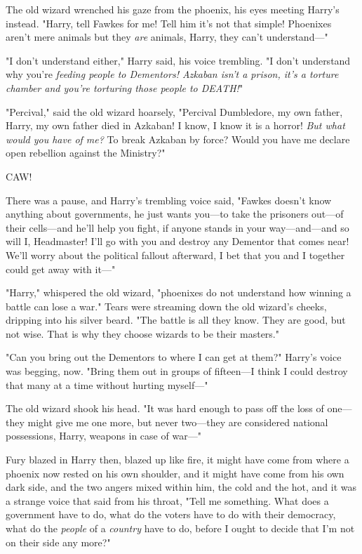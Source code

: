The old wizard wrenched his gaze from the phoenix, his eyes meeting Harry's 
instead. "Harry, tell Fawkes for me! Tell him it's not that simple! Phoenixes 
aren't mere animals but they \emph{are} animals, Harry, they can't 
understand---"

"I don't understand either," Harry said, his voice trembling. "I don't 
understand why you're \emph{feeding people to Dementors! Azkaban isn't a 
prison, it's a torture chamber and you're torturing those people to DEATH!}"

"Percival," said the old wizard hoarsely, "Percival Dumbledore, my own father, 
Harry, my own father died in Azkaban! I know, I know it is a horror! \emph{But 
what would you have of me?} To break Azkaban by force? Would you have me 
declare open rebellion against the Ministry?"

CAW!

There was a pause, and Harry's trembling voice said, "Fawkes doesn't know 
anything about governments, he just wants you---to take the prisoners out---of 
their cells---and he'll help you fight, if anyone stands in your 
way---and---and so will I, Headmaster! I'll go with you and destroy any 
Dementor that comes near! We'll worry about the political fallout afterward, I 
bet that you and I together could get away with it---"

"Harry," whispered the old wizard, "phoenixes do not understand how winning a 
battle can lose a war." Tears were streaming down the old wizard's cheeks, 
dripping into his silver beard. "The battle is all they know. They are good, 
but not wise. That is why they choose wizards to be their masters."

"Can you bring out the Dementors to where I can get at them?" Harry's voice was 
begging, now. "Bring them out in groups of fifteen---I think I could destroy 
that many at a time without hurting myself---"

The old wizard shook his head. "It was hard enough to pass off the loss of 
one---they might give me one more, but never two---they are considered national 
possessions, Harry, weapons in case of war---"

Fury blazed in Harry then, blazed up like fire, it might have come from where a 
phoenix now rested on his own shoulder, and it might have come from his own 
dark side, and the two angers mixed within him, the cold and the hot, and it 
was a strange voice that said from his throat, "Tell me something. What does a 
government have to do, what do the voters have to do with their democracy, what 
do the \emph{people} of a \emph{country} have to do, before I ought to decide 
that I'm not on their side any more?"

